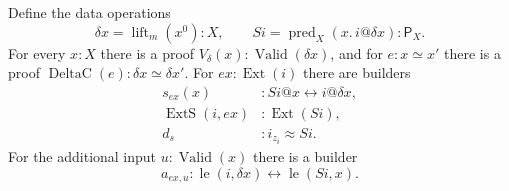 \begin{lemma}
\label{rel-shift}
Define the data operations
\[
 \delta x=\operatorname{lift}_m(x^0):X,
 \qquad
 Si=\operatorname{pred}_X(x.\,i@\delta x):\mathsf P_X.
\]
For every $x:X$ there is a proof
$V_\delta(x):\operatorname{Valid}(\delta x)$, and for
$e:x\simeq x'$ there is a proof
$\operatorname{DeltaC}(e):\delta x\simeq\delta x'$.
For $ex:\operatorname{Ext}(i)$ there are builders
\begin{align}
 s_{ex}(x)&:Si@x\leftrightarrow i@\delta x,
                                    \label{rel-shift-evaluation}\\
 \operatorname{ExtS}(i,ex)&:\operatorname{Ext}(Si),
                                    \label{rel-shift-extensionality}\\
 d_s&:i_{z_i}\approx Si.             \label{rel-shift-comparison}
\end{align}
For the additional input $u:\operatorname{Valid}(x)$ there is a builder
\begin{equation}
 a_{ex,u}:\operatorname{le}(i,\delta x)
                    \leftrightarrow\operatorname{le}(Si,x).
 \label{rel-shift-predecessor}
\end{equation}
\end{lemma}

